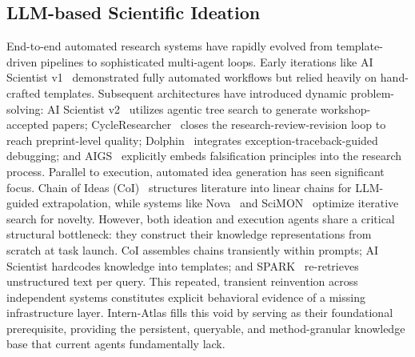 \documentclass{opendatalab}
\begin{document}
\subsection{LLM-based Scientific Ideation}
End-to-end automated research systems have rapidly evolved from template-driven pipelines to sophisticated multi-agent loops. Early iterations like AI Scientist v1~\cite{lu2024ai} demonstrated fully automated workflows but relied heavily on hand-crafted templates. Subsequent architectures have introduced dynamic problem-solving: AI Scientist v2~\cite{yamada2025ai} utilizes agentic tree search to generate workshop-accepted papers; CycleResearcher~\cite{weng2024cycleresearcher} closes the research-review-revision loop to reach preprint-level quality; Dolphin~\cite{yuan2025dolphin} integrates exception-traceback-guided debugging; and AIGS~\cite{liu2024aigs} explicitly embeds falsification principles into the research process.
Parallel to execution, automated idea generation has seen significant focus. Chain of Ideas (CoI)~\cite{li2024chain} structures literature into linear chains for LLM-guided extrapolation, while systems like Nova~\cite{hu2024nova} and SciMON~\cite{wang2024scimon} optimize iterative search for novelty. However, both ideation and execution agents share a critical structural bottleneck: they construct their knowledge representations from scratch at task launch. CoI assembles chains transiently within prompts; AI Scientist hardcodes knowledge into templates; and SPARK~\cite{sanyal2025spark} re-retrieves unstructured text per query. 
This repeated, transient reinvention across independent systems constitutes explicit behavioral evidence of a missing infrastructure layer. {Intern-Atlas} fills this void by serving as their foundational prerequisite, providing the persistent, queryable, and method-granular knowledge base that current agents fundamentally lack.
\end{document}
